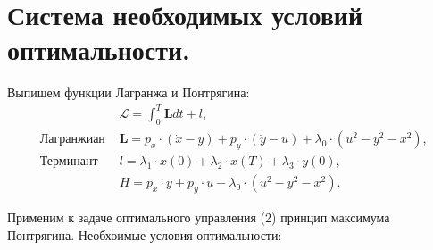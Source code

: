 \documentclass[a4paper,12pt]{article}
\begin{document}
\section{Система необходимых условий оптимальности.}
Выпишем функции Лагранжа и Понтрягина: 
\begin{align*}
&\mathcal{L}=\int_{0}^{T}\mathbf{L}dt + l,\\
\textrm{ Лагранжиан  } &\mathbf{L}=p_x \cdot (\dot x -y)+p_y \cdot (\dot y -u)+\lambda_0 \cdot (u^2-y^2-x^2),\\
\textrm{ Терминант  } &l=\lambda_1 \cdot x(0)+ \lambda_2 \cdot x(T) +\lambda_3 \cdot y(0),\\
&H=p_x \cdot y + p_y \cdot u- \lambda_0 \cdot (u^2-y^2-x^2).
\end{align*}

Применим к задаче оптимального управления (2) принцип максимума Понтрягина. Необхоимые условия оптимальности:
\end{document}
